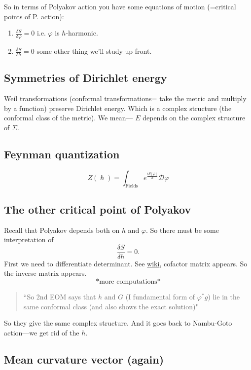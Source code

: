 So in terms of Polyakov action you have some equations of motion (=critical points of P. action):
\begin{enumerate}
\item \(\frac{ \delta S}{\delta \varphi}=0\) i.e. \(\varphi\) is \(h\)-harmonic.
\item \(\frac{\delta S}{\delta h}=0\) some other thing we'll study up front.
\end{enumerate}

\subsection{Symmetries of Dirichlet energy}

Weil transformations (conformal transformations= take the metric and multiply by a function) preserve Dirichlet energy. Which is a complex structure (the conformal class of the metric). We mean--- \(E\) depends on the complex structure of \(\Sigma\).

\subsection{Feynman quantization}

\[Z(\hslash)=\int_{\text{Fields} }e^{\frac{i S[\varphi]}{\hslash}}\mathcal{D}\varphi\]

\subsection{The other critical point of Polyakov}

Recall that Polyakov depends both on \(h\) and \(\varphi\). So there must be some interpretation of
\[\frac{\delta S}{\delta h}=0.\]
First we need to differentiate determinant. See \href{https://en.wikipedia.org/wiki/Adjugate_matrix#Jacobi's_formula}{wiki}, cofactor matrix appears. So the inverse matrix appears.
\[\text{*more computations*} \]
\begin{quotation}
	``So 2nd EOM says that \(h \) and \(G\) (I fundamental form of \(\varphi^*g\)) lie in the same conformal class (and also shows the exact solution)"
\end{quotation}
So they give the same complex structure. And it goes back to Nambu-Goto action---we get rid of the \(h\).

\subsection{Mean curvature vector (again)}

